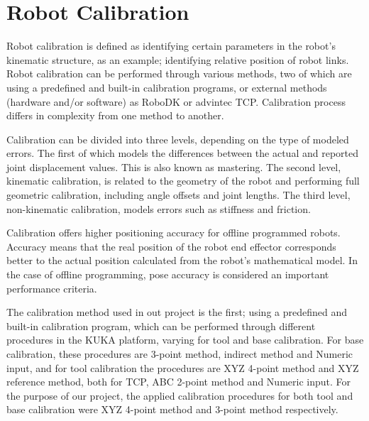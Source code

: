 	\newpage		
	\section{Robot Calibration}
	Robot calibration is defined as identifying certain parameters in the robot’s kinematic structure, as an example; identifying relative position of robot links. Robot calibration can be performed through various methods, two of which are using a predefined and built-in calibration programs, or external methods (hardware and/or software) as RoboDK or advintec TCP. Calibration process differs in complexity from one method to another. 

	Calibration can be divided into three levels, depending on the type of modeled errors. The first of which models the differences between the actual and reported joint displacement values. This is also known as mastering. The second level, kinematic calibration, is related to the geometry of the robot and performing full geometric calibration, including angle offsets and joint lengths. The third level, non-kinematic calibration, models errors such as stiffness and friction.

	Calibration offers higher positioning accuracy for offline programmed robots. Accuracy means that the real position of the robot end effector corresponds better to the actual position calculated from the robot’s mathematical model. In the case of offline programming, pose accuracy is considered an important performance criteria.
		
	The calibration method used in out project is the first; using a predefined and built-in calibration program, which can be performed through different procedures in the KUKA platform, varying for tool and base calibration. For base calibration, these procedures are 3-point method, indirect method and Numeric input, and for tool calibration the procedures are XYZ 4-point method and XYZ reference method, both for TCP, ABC 2-point method and Numeric input. For the purpose of our project, the applied calibration procedures for both tool and base calibration were XYZ 4-point method and 3-point method respectively.
		
